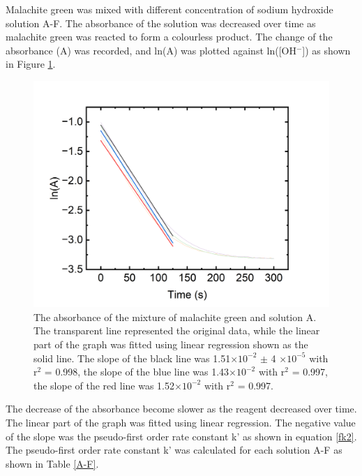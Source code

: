 \documentclass[twocolumn]{article} %
\begin{document}
Malachite green was mixed with different concentration of sodium hydroxide solution A-F. The absorbance of the solution was decreased over time as malachite green was reacted to form a colourless product. The change of the absorbance (A) was recorded, and ln(A) was plotted against ln([OH$^-$]) as shown in Figure \ref{A}.

\begin{figure}[H]
    \centering
    \includegraphics[width=\columnwidth]{part1A.png}
    \caption{The absorbance of the mixture of malachite green and solution A. The transparent line represented the original data, while the linear part of the graph was fitted using linear regression shown as the solid line. The slope of the black line was 1.51$\times 10^{-2}$ $\pm$ 4 $\times 10^{-5}$ with r$^2$ = 0.998, the slope of the blue line was 1.43$\times 10^{-2}$ with r$^2$ = 0.997, the slope of the red line was 1.52$\times 10^{-2}$ with r$^2$ = 0.997.}
    \label{A}
\end{figure}

The decrease of the absorbance become slower as the reagent decreased over time. The linear part of the graph was fitted using linear regression. The negative value of the slope was the pseudo-first order rate constant k' as shown in equation \ref{fk2}. The pseudo-first order rate constant k' was calculated for each solution A-F as shown in Table \ref{A-F}.
\end{document}
